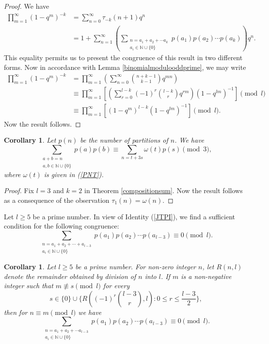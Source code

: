 \documentclass[10pt]{article}
\newtheorem{corollary}[theorem]{Corollary}
\theoremstyle{definition}
\begin{document}
\begin{proof}
We have
\begin{align*}
\prod_{m=1}^{\infty}(1-q^m)^{-k}&=\sum_{n=0}^\infty\tau_{-k}(n+1)q^n\\
&=1+\sum_{n=1}^{\infty}\left(\sum_{\substack{{n=a_1+a_2+\cdots a_k}\\{a_{i}\in\mathbb{N}\cup\{0\}}}}p(a_{1})p(a_{2})\cdots p(a_{k})\right)q^n.
\end{align*}
This equality permits us to present the congruence of this result in two different forms. Now in accordance with Lemma \ref{binomialmodulooddprime}, we may write
\begin{align*}
\prod_{m=1}^{\infty}(1-q^m)^{-k}&=\prod_{m=1}^{\infty}\left(\sum_{n=0}^{\infty}{{n+k-1}\choose{k-1}}q^{mn}\right)\\
&\equiv\prod_{m=1}^{\infty}\left[\left(\sum_{r=0}^{l-k}(-1)^r{{l-k}\choose{r}}q^{rm}\right)\left(1-q^{lm}\right)^{-1}\right]\pmod{l}\\
&\equiv\prod_{m=1}^{\infty}\left[(1-q^m)^{l-k}\left(1-q^{lm}\right)^{-1}\right]\pmod{l}.
\end{align*}
Now the result follows.
\end{proof}
\begin{corollary}
Let $p(n)$ be the number of partitions of $n$. We have
\begin{equation}
\sum_{\substack{{a+b=n}\\a,b\in\mathbb N\cup\{0\}}}p(a)p(b)\equiv \sum_{n=t+3s}\omega(t)p(s)\pmod{3},
\end{equation}
where $\omega(t)$ is given in (\ref{PNT}).

\end{corollary}
\begin{proof}
Fix $l=3$ and $k=2$ in Theorem \ref{compositionsum}. Now the result follows as a consequence of the observation $\tau_1(n)=\omega(n)$.
\end{proof}
Let $l\geq 5$ be a prime number. In view of Identity (\ref{JTPI}), we find a sufficient condition for the following congruence:
\[\sum_{\substack{{n=a_1+a_2+\cdots +a_{l-3}}\\{a_{i}\in\mathbb{N}\cup\{0\}}}}p(a_{1})p(a_{2})\cdots p(a_{l-3})\equiv 0\pmod{l}.
\]
\begin{corollary}
Let $l\geq 5$ be a prime number. For non-zero integer $n$, let $R(n, l)$ denote the remainder obtained by division of $n$ into $l$. If $m$ is a non-negative integer such that $m\not\equiv s\pmod{l}$ for every $$s\in\big\{0\big\}\cup\bigg\{R\left((-1)^r{{l-3}\choose{r}}, l\right):0\leq r\leq\frac{l-3}{2}\bigg\},$$ then for $n\equiv m\pmod{l}$ we have
\begin{equation}
\sum_{\substack{{n=a_1+a_2+\cdots a_{l-3}}\\{a_{i}\in\mathbb{N}\cup\{0\}}}}p(a_{1})p(a_{2})\cdots p(a_{l-3})\equiv 0\pmod{l}.
\end{equation}
\end{corollary}
\end{document}
